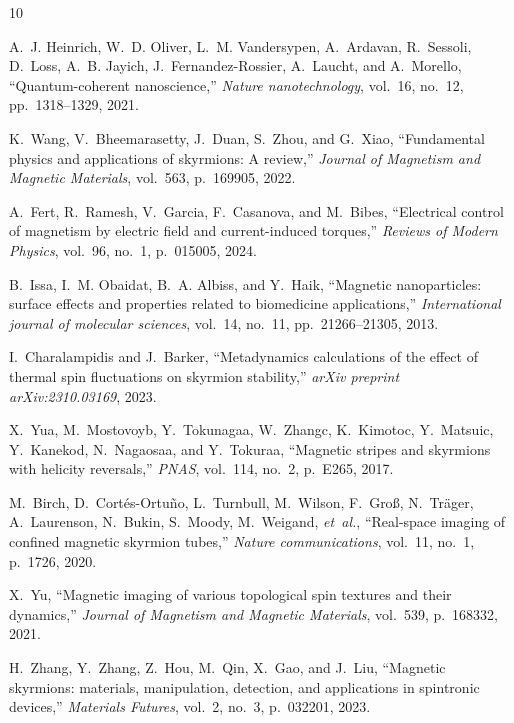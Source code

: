 \documentclass[final,5p,times,twocolumn]{elsarticle}
\begin{document}
%
%


\begin{thebibliography}{10}

A.~J. Heinrich, W.~D. Oliver, L.~M. Vandersypen, A.~Ardavan, R.~Sessoli, D.~Loss, A.~B. Jayich, J.~Fernandez-Rossier, A.~Laucht, and A.~Morello, ``Quantum-coherent nanoscience,'' {\em Nature nanotechnology}, vol.~16, no.~12, pp.~1318--1329, 2021.

K.~Wang, V.~Bheemarasetty, J.~Duan, S.~Zhou, and G.~Xiao, ``Fundamental physics and applications of skyrmions: A review,'' {\em Journal of Magnetism and Magnetic Materials}, vol.~563, p.~169905, 2022.

A.~Fert, R.~Ramesh, V.~Garcia, F.~Casanova, and M.~Bibes, ``Electrical control of magnetism by electric field and current-induced torques,'' {\em Reviews of Modern Physics}, vol.~96, no.~1, p.~015005, 2024.

B.~Issa, I.~M. Obaidat, B.~A. Albiss, and Y.~Haik, ``Magnetic nanoparticles: surface effects and properties related to biomedicine applications,'' {\em International journal of molecular sciences}, vol.~14, no.~11, pp.~21266--21305, 2013.

I.~Charalampidis and J.~Barker, ``Metadynamics calculations of the effect of thermal spin fluctuations on skyrmion stability,'' {\em arXiv preprint arXiv:2310.03169}, 2023.

X.~Yua, M.~Mostovoyb, Y.~Tokunagaa, W.~Zhangc, K.~Kimotoc, Y.~Matsuic, Y.~Kanekod, N.~Nagaosaa, and Y.~Tokuraa, ``Magnetic stripes and skyrmions with helicity reversals,'' {\em PNAS}, vol.~114, no.~2, p.~E265, 2017.

M.~Birch, D.~Cort{\'e}s-Ortu{\~n}o, L.~Turnbull, M.~Wilson, F.~Gro{\ss}, N.~Tr{\"a}ger, A.~Laurenson, N.~Bukin, S.~Moody, M.~Weigand, {\em et~al.}, ``Real-space imaging of confined magnetic skyrmion tubes,'' {\em Nature communications}, vol.~11, no.~1, p.~1726, 2020.

X.~Yu, ``Magnetic imaging of various topological spin textures and their dynamics,'' {\em Journal of Magnetism and Magnetic Materials}, vol.~539, p.~168332, 2021.

H.~Zhang, Y.~Zhang, Z.~Hou, M.~Qin, X.~Gao, and J.~Liu, ``Magnetic skyrmions: materials, manipulation, detection, and applications in spintronic devices,'' {\em Materials Futures}, vol.~2, no.~3, p.~032201, 2023.


\end{thebibliography}
\end{document}
